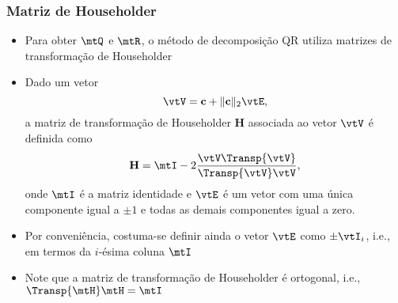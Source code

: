 \begin{frame}
  \frametitle{Matriz de Householder}
  \begin{itemize}
    \item Para obter $\mtQ$ e $\mtR$, o método de decomposição QR utiliza matrizes de transformação de Householder
    \item Dado um vetor
    \begin{equation}
      \vtV = \mathbf{c} + \Vert \mathbf{c} \Vert_2\vtE,
    \end{equation}
    a {\alert{matriz de transformação de Householder}} $\mathbf{H}$ associada ao vetor $\vtV$ é definida como
    \begin{equation}\label{eq_householder}
      \mathbf{H} = \mtI - 2\frac{\vtV\Transp{\vtV}}{\Transp{\vtV}\vtV},
    \end{equation}
    onde $\mtI$ é a matriz identidade e $\vtE$ é um vetor com uma única componente igual a $\pm 1$ e todas as demais componentes igual a zero.
    \item Por conveniência, costuma-se definir ainda o vetor $\vtE$ como $\pm\vtI_i$, i.e., em termos da $i$-ésima coluna $\mtI$
    \item Note que a matriz de transformação de Householder é ortogonal, i.e., $\Transp{\mtH}\mtH = \mtI$
  \end{itemize}
\end{frame}

